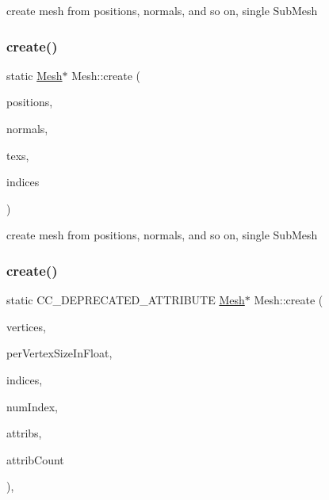 create mesh from positions, normals, and so on, single Sub\+Mesh \mbox{\label{classMesh_a202e7feff9cebe878ad1c157a8f644d0}} 
\subsubsection{\texorpdfstring{create()}{create()}\hspace{0.1cm}{\footnotesize\ttfamily [2/8]}}
{\footnotesize\ttfamily static \hyperlink{classMesh}{Mesh}$\ast$ Mesh\+::create (\begin{DoxyParamCaption}\item[{const std\+::vector$<$ float $>$ \&}]{positions,  }\item[{const std\+::vector$<$ float $>$ \&}]{normals,  }\item[{const std\+::vector$<$ float $>$ \&}]{texs,  }\item[{const Index\+Array \&}]{indices }\end{DoxyParamCaption})\hspace{0.3cm}{\ttfamily [static]}}

create mesh from positions, normals, and so on, single Sub\+Mesh \mbox{\label{classMesh_ae8d51994d357534680ed36bfe0d6346a}} 
\subsubsection{\texorpdfstring{create()}{create()}\hspace{0.1cm}{\footnotesize\ttfamily [3/8]}}
{\footnotesize\ttfamily static C\+C\+\_\+\+D\+E\+P\+R\+E\+C\+A\+T\+E\+D\+\_\+\+A\+T\+T\+R\+I\+B\+U\+TE \hyperlink{classMesh}{Mesh}$\ast$ Mesh\+::create (\begin{DoxyParamCaption}\item[{const std\+::vector$<$ float $>$ \&}]{vertices,  }\item[{int}]{per\+Vertex\+Size\+In\+Float,  }\item[{const Index\+Array \&}]{indices,  }\item[{int}]{num\+Index,  }\item[{const std\+::vector$<$ \hyperlink{structMeshVertexAttrib}{Mesh\+Vertex\+Attrib} $>$ \&}]{attribs,  }\item[{int}]{attrib\+Count }\end{DoxyParamCaption})\hspace{0.3cm}{\ttfamily [inline]}, {\ttfamily [static]}}

